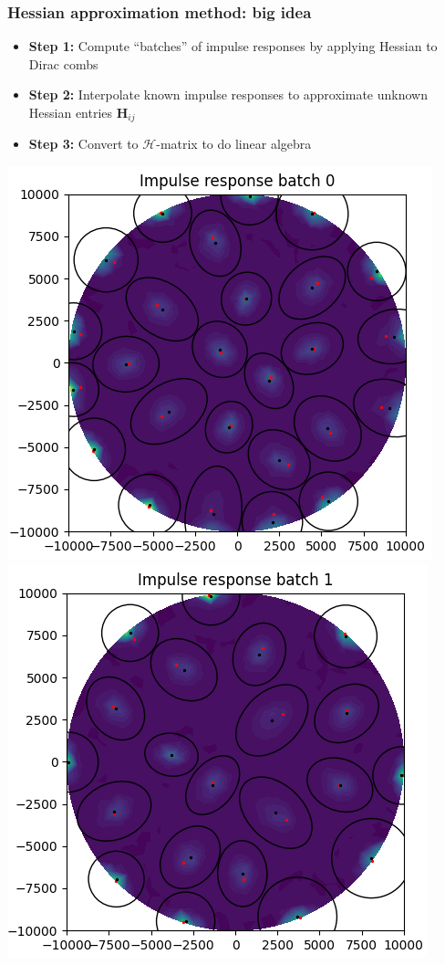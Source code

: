 \documentclass[10pt,final,xcolor=dvipsnames]{beamer}
\begin{document}
\begin{frame}


\end{frame}
\begin{frame}
  \frametitle{Hessian approximation method: big idea}
      \begin{itemize}
      \item {\bf Step 1:} Compute ``batches'' of impulse responses by applying Hessian to Dirac combs
      \item {\bf Step 2:} Interpolate known impulse responses to approximate unknown Hessian entries $\mathbf{H}_{ij}$
      \item {\bf Step 3:} Convert to $\mathcal{H}$-matrix to do linear algebra
      \end{itemize}
  	\includegraphics[width=0.49\columnwidth]{impulseresponse0.png}  \includegraphics[width=0.49\columnwidth]{impulseresponse1.png}
\end{frame}
\end{document}
